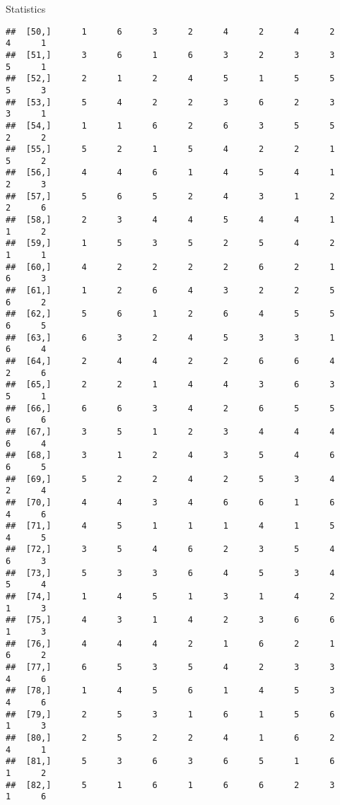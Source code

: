 \documentclass[
  ignorenonframetext,
]{beamer}
\begin{document}
\begin{frame}[fragile]{Statistics}
\begin{verbatim}
##  [50,]      1      6      3      2      4      2      4      2      4      1
##  [51,]      3      6      1      6      3      2      3      3      5      1
##  [52,]      2      1      2      4      5      1      5      5      5      3
##  [53,]      5      4      2      2      3      6      2      3      3      1
##  [54,]      1      1      6      2      6      3      5      5      2      2
##  [55,]      5      2      1      5      4      2      2      1      5      2
##  [56,]      4      4      6      1      4      5      4      1      2      3
##  [57,]      5      6      5      2      4      3      1      2      2      6
##  [58,]      2      3      4      4      5      4      4      1      1      2
##  [59,]      1      5      3      5      2      5      4      2      1      1
##  [60,]      4      2      2      2      2      6      2      1      6      3
##  [61,]      1      2      6      4      3      2      2      5      6      2
##  [62,]      5      6      1      2      6      4      5      5      6      5
##  [63,]      6      3      2      4      5      3      3      1      6      4
##  [64,]      2      4      4      2      2      6      6      4      2      6
##  [65,]      2      2      1      4      4      3      6      3      5      1
##  [66,]      6      6      3      4      2      6      5      5      6      6
##  [67,]      3      5      1      2      3      4      4      4      6      4
##  [68,]      3      1      2      4      3      5      4      6      6      5
##  [69,]      5      2      2      4      2      5      3      4      2      4
##  [70,]      4      4      3      4      6      6      1      6      4      6
##  [71,]      4      5      1      1      1      4      1      5      4      5
##  [72,]      3      5      4      6      2      3      5      4      6      3
##  [73,]      5      3      3      6      4      5      3      4      5      4
##  [74,]      1      4      5      1      3      1      4      2      1      3
##  [75,]      4      3      1      4      2      3      6      6      1      3
##  [76,]      4      4      4      2      1      6      2      1      6      2
##  [77,]      6      5      3      5      4      2      3      3      4      6
##  [78,]      1      4      5      6      1      4      5      3      4      6
##  [79,]      2      5      3      1      6      1      5      6      1      3
##  [80,]      2      5      2      2      4      1      6      2      4      1
##  [81,]      5      3      6      3      6      5      1      6      1      2
##  [82,]      5      1      6      1      6      6      2      3      1      6

\end{verbatim}
\end{frame}
\end{document}
